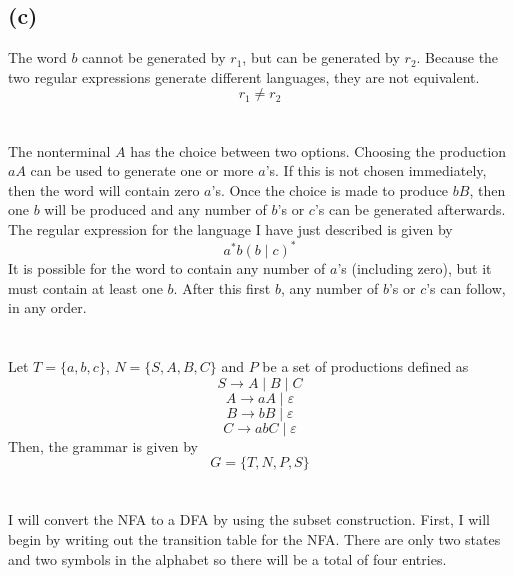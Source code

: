 \documentclass[12pt]{article}
\begin{document}
\subsection*{(c)}

The word $b$ cannot be generated by $r_1$, but can be generated by $r_2$. Because the two regular expressions generate different languages, they are not equivalent. $$\boxed{r_1 \neq r_2}$$

\section{}

The nonterminal $A$ has the choice between two options. Choosing the production $aA$ can be used to generate one or more $a$'s. If this is not chosen immediately, then the word will contain zero $a$'s. Once the choice is made to produce $bB$, then one $b$ will be produced and any number of $b$'s or $c$'s can be generated afterwards. The regular expression for the language I have just described is given by $$ \boxed{a^*b(b \mid c)^*} $$ It is possible for the word to contain any number of $a$'s (including zero), but it must contain at least one $b$. After this first $b$, any number of $b$'s or $c$'s can follow, in any order. 

\section{}

Let $T = \{a, b, c\}$, $N = \{S, A, B, C\}$ and $P$ be a set of productions defined as $$ S \rightarrow A \mid B \mid C $$ $$ A \rightarrow aA \mid \varepsilon $$ $$ B \rightarrow bB \mid \varepsilon $$ $$ C \rightarrow abC \mid \varepsilon $$ Then, the grammar is given by $$ \boxed{G = \{T, N, P, S\}} $$

\section{}

I will convert the NFA to a DFA by using the subset construction. First, I will begin by writing out the transition table for the NFA. There are only two states and two symbols in the alphabet so there will be a total of four entries. 
\end{document}
